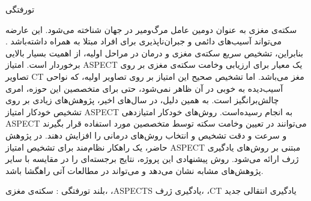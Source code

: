 


‌تورفتگی

سکته‌ی مغزی به عنوان دومین عامل مرگ‌و‌میر در جهان شناخته می‌شود.
این عارضه می‌تواند آسیب‌های دائمی و جبران‌ناپذیری برای افراد مبتلا به همراه داشته‌باشد \cite{donkor2018stroke}.
بنابراین،
تشخیص سریع سکته‌ی مغزی و درمان در مراحل اولیه، از اهمیت بسیار بالایی برخوردار است.
امتیاز ASPECT یک معیار برای ارزیابی وخامت سکته‌ی مغزی بر روی تصاویر CT مغز می‌باشد.
اما تشخیص صحیح این امتیاز بر روی تصاویر اولیه، که نواحی آسیب‌دیده به خوبی در آن ظاهر نمی‌شود، حتی برای متخصصین این حوزه، امری چالش‌بر‌انگیز است.
به همین دلیل، در سال‌های اخیر، پژوهش‌های زیادی بر روی تشخیص خودکار امتیاز ASPECT به انجام رسیده‌است.
روش‌های خودکار امتیاز‌دهی ASPECT می‌توانند
 در تعیین وخامت سکته توسط متخصصین مورد استفاده قرار بگیرند و سرعت و دقت تشخیص و انتخاب روش‌های درمانی را افزایش دهند.
 در پژوهش حاضر، 
 یک راهکار نظام‌مند برای تشخیص امتیاز ASPECT مبتنی بر روش‌های یادگیری ژرف ارائه می‌شود.
 روش پیشنهادی این پروژه،
 نتایج برجسته‌ای 
  را در مقایسه با سایر پژوهش‌های مشابه نشان می‌دهد و
می‌تواند در مطالعات آتی راهگشا باشد.

‌بلند
‌تورفتگی : 
سکته‌ی مغزی، ،ASPECTS یادگیری ژرف، ،CT یادگیری انتقالی
‌جدید
